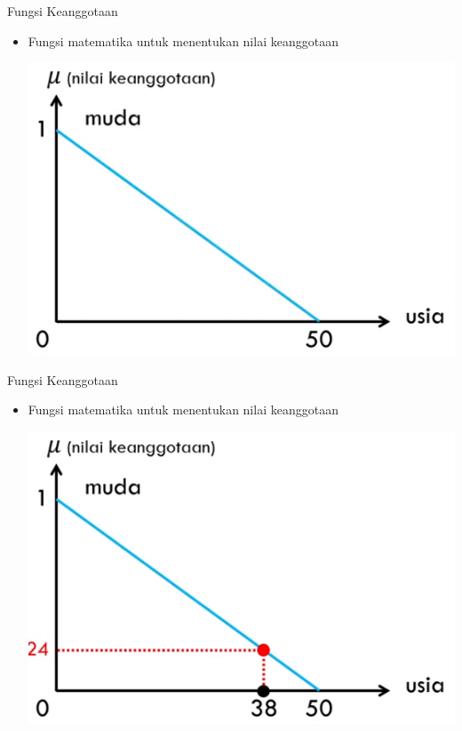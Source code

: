 \documentclass[pdflatex,compress,mathserif]{beamer}
\begin{document}
\begin{frame}{Fungsi Keanggotaan}
	\begin{itemize}
		\item Fungsi matematika untuk menentukan nilai keanggotaan
		\begin{center}
			\includegraphics[width=0.5\linewidth]{img/07}
		\end{center}
	\end{itemize}
\end{frame}

\begin{frame}{Fungsi Keanggotaan}
	\begin{itemize}
		\item Fungsi matematika untuk menentukan nilai keanggotaan
		\begin{center}
			\includegraphics[width=0.5\linewidth]{img/08}
		\end{center}
	\end{itemize}
\end{frame}
\end{document}
